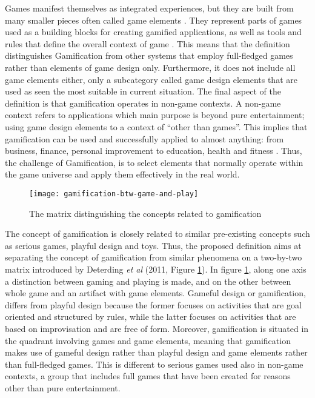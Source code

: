Games manifest themselves as integrated experiences, but they are built from many smaller pieces often called game elements \cite{werbach2012win}. They represent parts of games used as a building blocks for creating gamified applications, as well as tools and rules that define the overall context of game \cite{gamDesElem}. This means that the definition distinguishes Gamification from other systems that employ full-fledged games rather than elements of game design only. Furthermore, it does not include all game elements either, only a subcategory called game design elements that are used as seen the most suitable in current situation. %
The final aspect of the definition is that gamification operates in non-game contexts. A non-game context refers to applications which main purpose is beyond pure entertainment; using game design elements to a context of ``other than games''. This implies that gamification can be used and successfully applied to almost anything: from business, finance, personal improvement to education, health and fitness \cite{deterding2011game}. Thus, the challenge of Gamification, is to select elements that normally operate within the game universe and apply them effectively in the real world.
\begin{figure}[h]
    \centering
    \texttt{[image: gamification-btw-game-and-play]}
    \caption{The matrix distinguishing the concepts related to gamification}
    \label{fig:mesh1}
\end{figure}
The concept of gamification is closely related to similar pre-existing concepts such as serious games, playful design and toys. Thus, the proposed definition aims at separating the concept of gamification from similar phenomena on a two-by-two matrix introduced by Deterding \textit{et al} (2011, Figure \ref{fig:mesh1}). 
In figure \ref{fig:mesh1}, along one axis a distinction between gaming and playing is made, and on the other between whole game and an artifact with game elements. Gameful design or gamification, differs from playful design because the former focuses on activities that are goal oriented and structured by rules, while the latter focuses on activities that are based on improvisation and are free of form. Moreover, gamification is situated in the quadrant involving games and game elements, meaning that gamification makes use of gameful design rather than playful design and game elements rather than full-fledged games. This is different to serious games used also in non-game contexts, a group that includes full games that have been created for reasons other than pure entertainment. 
